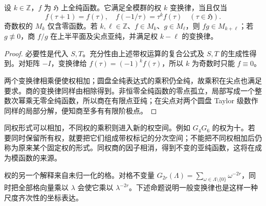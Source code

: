 \begin{proposition}[生成元判别与权的运算]\label{b3:prop:23-weight-operations}
设 \(k\in\mathbb Z\)，\(f\) 为 \(\mathfrak H\) 上全纯函数。它满足全模群的权 \(k\) 变换律，当且仅当
\begin{equation}\label{b3:eq:23-generators-form-law}
 f(\tau+1)=f(\tau),\quad
 f(-1/\tau)=\tau^k f(\tau)
 \quad(\tau\in\mathfrak H).
\end{equation}
奇数权的 \(M_k\) 仅含零函数。若 \(k,\ell\in\mathbb Z\)、\(f\in M_k\)、\(g\in M_\ell\)，则 \(fg\in M_{k+\ell}\)；若 \(g\not\equiv0\)，商 \(f/g\) 在上半平面及尖点亚纯，并满足权 \(k-\ell\) 的变换律。
\end{proposition}
\begin{proof}
必要性是代入 \(S,T\)。充分性由上述带权运算的复合公式及 \(S,T\) 的生成性得到。对矩阵 \(-I\)，变换律给 \(f(\tau)=(-1)^kf(\tau)\)，所以 \(k\) 为奇数时只能 \(f\equiv0\)。

两个变换律相乘便使权相加；圆盘全纯表达式的乘积仍全纯，故乘积在尖点也满足要求。商的变换律同样由相除得到。非恒零全纯函数的零点孤立，局部写成一个整数次幂乘无零全纯函数，所以商在有限点亚纯；在尖点对两个圆盘 Taylor 级数作同样的局部分解，便知商至多有有限阶极点。
\end{proof}

同权形式可以相加，不同权的乘积则进入新的权空间。例如 \(G_4G_6\) 的权为十。若要同时保留所有权，就要把它们组成带权标记的分次空间；不能把不同权相加后仍称为原来某个固定权的形式。同权商的因子相消，得到不变的亚纯函数，这将在成为模函数的来源。

\ProseParagraphBreak
权的另一个解释来自未归一化的格。对格不变量 \(G_{2r}(\Lambda)=\sum_{\omega\in\Lambda\setminus\{0\}}\omega^{-2r}\)，同时把全部格向量乘以 \(\lambda\) 会使它乘以 \(\lambda^{-2r}\)。下述命题说明一般变换律也是这样一种尺度齐次性的坐标表达。

